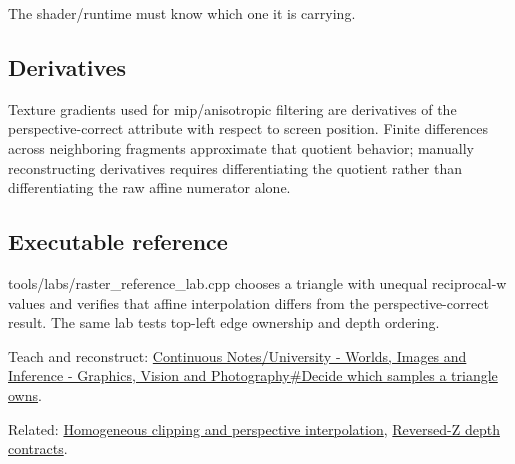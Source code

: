 The shader/runtime must know which one it is carrying.

\subsection{Derivatives}\label{derivatives}

Texture gradients used for mip/anisotropic filtering are derivatives of the perspective-correct attribute with respect to screen position. Finite differences across neighboring fragments approximate that quotient behavior; manually reconstructing derivatives requires differentiating the quotient rather than differentiating the raw affine numerator alone.

\subsection{Executable reference}\label{executable-reference}

tools/labs/raster\_reference\_lab.cpp chooses a triangle with unequal reciprocal-w values and verifies that affine interpolation differs from the perspective-correct result. The same lab tests top-left edge ownership and depth ordering.

Teach and reconstruct: \href{Continuous\%20Notes/University\%20-\%20Worlds,\%20Images\%20and\%20Inference\%20-\%20Graphics,\%20Vision\%20and\%20Photography\#Decide\%20which\%20samples\%20a\%20triangle\%20owns}{Continuous Notes/University - Worlds, Images and Inference - Graphics, Vision and Photography\#Decide which samples a triangle owns}.

Related: \hyperref[appendix-40426e4b2103]{Homogeneous clipping and perspective interpolation}, \hyperref[appendix-275ec8847057]{Reversed-Z depth contracts}.
